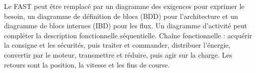 \begin{corrigebox}
Le FAST peut être remplacé par un diagramme des exigences pour exprimer
            le besoin, un diagramme de définition de blocs (BDD) pour l'architecture et un
            diagramme de blocs internes (IBD) pour les flux. Un diagramme d'activité peut
            compléter la description fonctionnelle séquentielle.
Chaîne fonctionnelle : acquérir la consigne et les sécurités, puis
            traiter et commander, distribuer l'énergie, convertir par le moteur,
            transmettre et réduire, puis agir sur la charge. Les retours sont la position,
            la vitesse et les fins de course.
\end{corrigebox}
